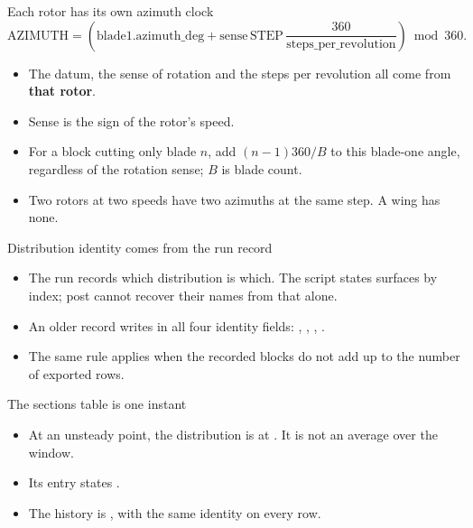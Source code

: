 \begin{frame}{Each rotor has its own azimuth clock}
\small
\[
\mathrm{AZIMUTH}=\left(
  \mathrm{blade1.azimuth\_deg}
  +\mathrm{sense}\,\mathrm{STEP}\,
   \frac{360}{\mathrm{steps\_per\_revolution}}
\right)\bmod 360.
\]
\begin{itemize}
  \item The datum, the sense of rotation and the steps per revolution all
        come from \textbf{that rotor}.
  \item Sense is the sign of the rotor's speed.
  \item For a block cutting only blade \(n\), add \((n-1)360/B\) to this
        blade-one angle, regardless of the rotation sense; \(B\) is blade count.
  \item Two rotors at two speeds have two azimuths at the same step.
        A wing has none.
\end{itemize}
\end{frame}

\begin{frame}{Distribution identity comes from the run record}
\begin{itemize}
  \item The run records which distribution is which. The script states
        surfaces by index; post cannot recover their names from that alone.
  \item An older record writes  in all four identity
        fields: , , , .
  \item The same rule applies when the recorded blocks do not add up to
        the number of exported rows.
\end{itemize}
\end{frame}

\begin{frame}{The sections table is one instant}
\begin{itemize}
  \item At an unsteady point, the distribution is at .
        It is not an average over the window.
  \item Its  entry states .
  \item The history is ,
        with the same identity on every row.
\end{itemize}
\end{frame}

